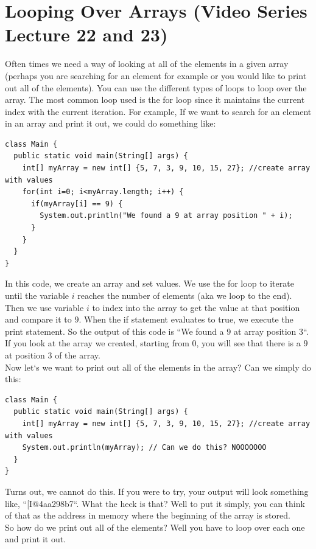 \documentclass[11]{article}
\begin{document}
\section{Looping Over Arrays (Video Series Lecture 22 and 23)}
Often times we need a way of looking at all of the elements in a given array (perhaps you are searching for an element for example or you would like to print out all of the elements). You can use the different types of loops to loop over the array. The most common loop used is the for loop since it maintains the current index with the current iteration. For example, If we want to search for an element in an array and print it out, we could do something like:

\begin{lstlisting}
class Main {
  public static void main(String[] args) {
    int[] myArray = new int[] {5, 7, 3, 9, 10, 15, 27}; //create array with values
    for(int i=0; i<myArray.length; i++) {
      if(myArray[i] == 9) {
        System.out.println("We found a 9 at array position " + i);
      }
    }
  }
}
\end{lstlisting}
In this code, we create an array and set values. We use the for loop to iterate until the variable $i$ reaches the number of elements (aka we loop to the end). Then we use variable $i$ to index into the array to get the value at that position and compare it to $9$. When the if statement evaluates to true, we execute the print statement. So the output of this code is ``We found a 9 at array position $3$``. If you look at the array we created, starting from $0$, you will see that there is a $9$ at position $3$ of the array.\\

Now let`s we want to print out all of the elements in the array? Can we simply do this:

\begin{lstlisting}
class Main {
  public static void main(String[] args) {
    int[] myArray = new int[] {5, 7, 3, 9, 10, 15, 27}; //create array with values
	System.out.println(myArray); // Can we do this? NOOOOOOO
  }
}
\end{lstlisting}

Turns out, we cannot do this. If you were to try, your output will look something like, ``[I@4aa298b7``. What the heck is that? Well to put it simply, you can think of that as the address in memory where the beginning of the array is stored.\\

So how do we print out all of the elements? Well you have to loop over each one and print it out.
\end{document}

